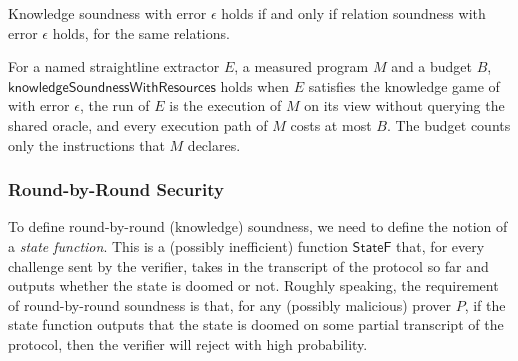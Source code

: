 \begin{theorem}
    \label{thm:knowledge_soundness_iff_relation_soundness}
    Knowledge soundness with error \(\epsilon\) holds if and only if relation soundness with error
    \(\epsilon\) holds, for the same relations.
    \leanok
\end{theorem}

\begin{definition}
    \label{def:knowledge_soundness_with_resources}
    For a named straightline extractor \(E\), a measured program \(M\) and a budget \(B\),
    \(\mathsf{knowledgeSoundnessWithResources}\) holds when \(E\) satisfies the knowledge game of
     with error \(\epsilon\), the run of \(E\) is the execution of \(M\) on
    its view without querying the shared oracle, and every execution path of \(M\) costs at most
    \(B\). The budget counts only the instructions that \(M\) declares.
    \leanok
\end{definition}

\subsubsection{Round-by-Round Security}

To define round-by-round (knowledge) soundness, we need to define the notion of a \emph{state function}. This is a (possibly inefficient) function \(\mathsf{StateF}\) that, for every challenge sent by the verifier, takes in the transcript of the protocol so far and outputs whether the state is doomed or not. Roughly speaking, the requirement of round-by-round soundness is that, for any (possibly malicious) prover \(P\), if the state function outputs that the state is doomed on some partial transcript of the protocol, then the verifier will reject with high probability.

